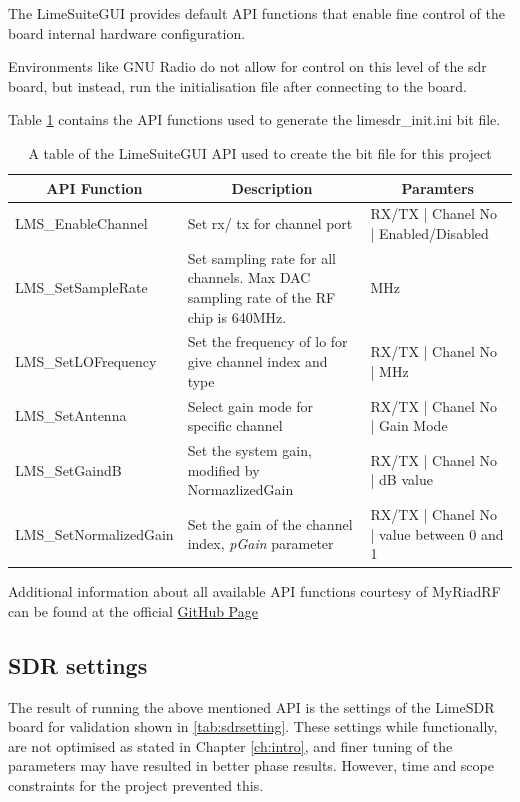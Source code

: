 \documentclass[class=report,11pt,crop=false]{standalone}
\begin{document}
The LimeSuiteGUI provides default \gls{API} functions that enable fine control of the board internal hardware configuration. 

Environments like GNU Radio do not allow for control on this level of the \gls{sdr} board, but instead, run the initialisation file after connecting to the board. 

Table \ref{tab:lime-api} contains the \gls{API} functions used to generate the limesdr\_init.ini bit file. 

\begin{table}[]
    \centering
    \begin{tabular}{|m{4.1cm} | m{7cm}| m{5cm} | }
        \hline
        \multicolumn{1}{|c}{\textbf{\gls{API} Function}} & \multicolumn{1}{|c|}{\textbf{Description}} & \multicolumn{1}{c|}{\textbf{Paramters}} \\
        \hline
        \hline
        LMS\_EnableChannel & Set \gls{rx}/ \gls{tx} for channel port & RX/TX | Chanel No | Enabled/Disabled \\
        \hline
        LMS\_SetSampleRate & Set sampling rate for all channels. Max DAC sampling rate of the RF chip is 640MHz. & MHz \\
        \hline
        LMS\_SetLOFrequency & Set the frequency of \gls{lo} for give channel index and type & RX/TX | Chanel No | MHz \\
        \hline
        LMS\_SetAntenna  & Select gain mode for specific channel & RX/TX | Chanel No | Gain Mode \\
        \hline
        LMS\_SetGaindB & Set the system gain, modified by NormazlizedGain & RX/TX | Chanel No | dB value \\
        \hline 
        LMS\_SetNormalizedGain & Set the gain of the channel index,  \emph{pGain} parameter  &  RX/TX | Chanel No | value between 0 and 1\\ 
        \hline
        
    \end{tabular}
    \caption{A table of the LimeSuiteGUI \gls{API} used to create the bit file for this project}
    \label{tab:lime-api}
\end{table}

Additional information about all available \gls{API} functions courtesy of MyRiadRF can be found at the official \href{https://github.com/myriadrf/LimeSuite/tree/master/src/examples}{GitHub Page} 

\subsection{SDR settings}
The result of running the above mentioned \gls{API} is the settings of the LimeSDR board for validation shown in \ref{tab:sdrsetting}. These settings while functionally, are not optimised as stated in Chapter \ref{ch:intro}, and finer tuning of the parameters may have resulted in better phase results. However, time and scope constraints for the project prevented this. 
\end{document}
